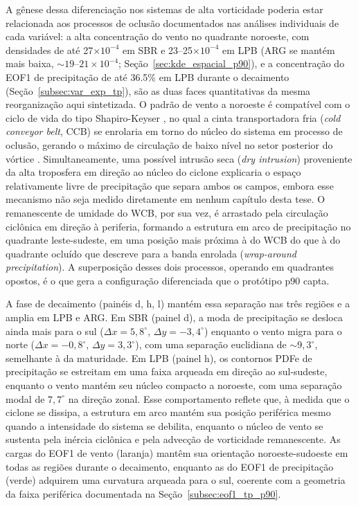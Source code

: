 A gênese dessa diferenciação nos sistemas de alta vorticidade poderia estar relacionada aos processos de oclusão documentados nas análises individuais de cada variável: a alta concentração do vento no quadrante noroeste, com densidades de até 27$\times10^{-4}$ em SBR e 23--25$\times10^{-4}$ em LPB (ARG se mantém mais baixa, ${\sim}19$--$21\times10^{-4}$; Seção~\ref{sec:kde_espacial_p90}), e a concentração do EOF1 de precipitação de até 36.5\% em LPB durante o decaimento (Seção~\ref{subsec:var_exp_tp}), são as duas faces quantitativas da mesma reorganização aqui sintetizada. O padrão de vento a noroeste é compatível com o ciclo de vida do tipo Shapiro-Keyser \citep{shapiro1990life}, no qual a cinta transportadora fria (\textit{cold conveyor belt}, CCB) se enrolaria em torno do núcleo do sistema em processo de oclusão, gerando o máximo de circulação de baixo nível no setor posterior do vórtice \citep{schemm2014linkage}. Simultaneamente, uma possível intrusão seca (\textit{dry intrusion}) proveniente da alta troposfera em direção ao núcleo do ciclone explicaria o espaço relativamente livre de precipitação que separa ambos os campos, embora esse mecanismo não seja medido diretamente em nenhum capítulo desta tese. O remanescente de umidade do WCB, por sua vez, é arrastado pela circulação ciclônica em direção à periferia, formando a estrutura em arco de precipitação no quadrante leste-sudeste, em uma posição mais próxima à do WCB do que à do quadrante ocluído que \citet{martin1999forcing} descreve para a banda enrolada (\textit{wrap-around precipitation}). A superposição desses dois processos, operando em quadrantes opostos, é o que gera a configuração diferenciada que o protótipo p90 capta.

A fase de decaimento (painéis d, h, l) mantém essa separação nas três regiões e a amplia em LPB e ARG. Em SBR (painel d), a moda de precipitação se desloca ainda mais para o sul ($\Delta x = 5{,}8^{\circ}$, $\Delta y = -3{,}4^{\circ}$) enquanto o vento migra para o norte ($\Delta x = -0{,}8^{\circ}$, $\Delta y = 3{,}3^{\circ}$), com uma separação euclidiana de ${\sim}9{,}3^{\circ}$, semelhante à da maturidade. Em LPB (painel h), os contornos PDFe de precipitação se estreitam em uma faixa arqueada em direção ao sul-sudeste, enquanto o vento mantém seu núcleo compacto a noroeste, com uma separação modal de $7{,}7^{\circ}$ na direção zonal. Esse comportamento reflete que, à medida que o ciclone se dissipa, a estrutura em arco mantém sua posição periférica mesmo quando a intensidade do sistema se debilita, enquanto o núcleo de vento se sustenta pela inércia ciclônica e pela advecção de vorticidade remanescente. As cargas do EOF1 de vento (laranja) mantêm sua orientação noroeste-sudoeste em todas as regiões durante o decaimento, enquanto as do EOF1 de precipitação (verde) adquirem uma curvatura arqueada para o sul, coerente com a geometria da faixa periférica documentada na Seção~\ref{subsec:eof1_tp_p90}.

